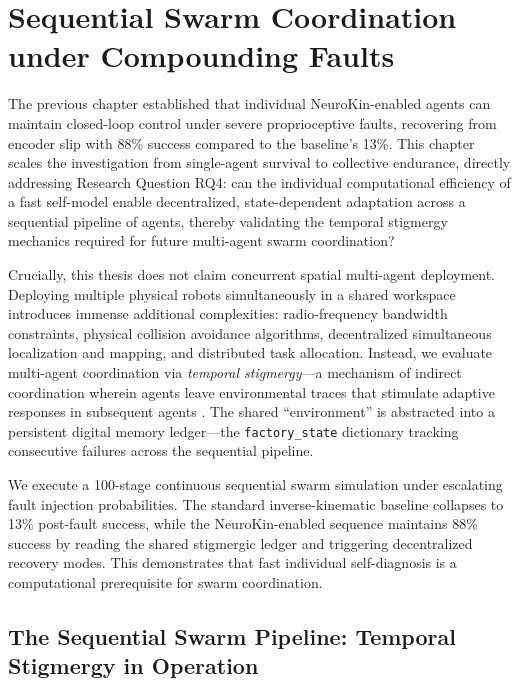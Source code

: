 \documentclass[12pt,a4paper,oneside]{report}
\begin{document}
\clearpage

\chapter{Sequential Swarm Coordination under Compounding Faults}
\label{chap:sequential_swarm_coordination}

The previous chapter established that individual NeuroKin-enabled agents can maintain closed-loop control under severe proprioceptive faults, recovering from encoder slip with 88\% success compared to the baseline's 13\%. This chapter scales the investigation from single-agent survival to collective endurance, directly addressing Research Question RQ4: can the individual computational efficiency of a fast self-model enable decentralized, state-dependent adaptation across a sequential pipeline of agents, thereby validating the temporal stigmergy mechanics required for future multi-agent swarm coordination?

Crucially, this thesis does not claim concurrent spatial multi-agent deployment. Deploying multiple physical robots simultaneously in a shared workspace introduces immense additional complexities: radio-frequency bandwidth constraints, physical collision avoidance algorithms, decentralized simultaneous localization and mapping, and distributed task allocation. Instead, we evaluate multi-agent coordination via \textit{temporal stigmergy}---a mechanism of indirect coordination wherein agents leave environmental traces that stimulate adaptive responses in subsequent agents \cite{bongard2006resilient}. The shared ``environment'' is abstracted into a persistent digital memory ledger---the \texttt{factory\_state} dictionary tracking consecutive failures across the sequential pipeline.

We execute a 100-stage continuous sequential swarm simulation under escalating fault injection probabilities. The standard inverse-kinematic baseline collapses to 13\% post-fault success, while the NeuroKin-enabled sequence maintains 88\% success by reading the shared stigmergic ledger and triggering decentralized recovery modes. This demonstrates that fast individual self-diagnosis is a computational prerequisite for swarm coordination.

\section{The Sequential Swarm Pipeline: Temporal Stigmergy in Operation}
\end{document}
